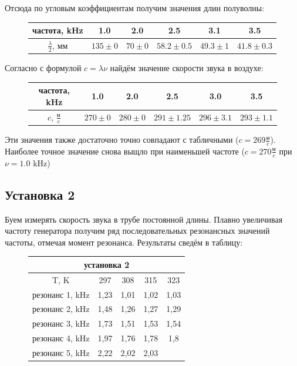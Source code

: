 \documentclass{article}
\begin{document}
Отсюда по угловым коэффициентам получим значения длин полуволны:

\begin{figure}[H]
    \centering
    \begin{tabular}{|c|c|c|c|c|c|}
    \hline
    частота, kHz & 1.0 & 2.0 & 2.5 & 3.1 & 3.5 \\\hline
    $\frac{\lambda}{2}$, мм & $135 \pm 0$ & $70 \pm 0$ & $58.2 \pm 0.5$ & $49.3 \pm 1$ & $41.8 \pm 0.3$ \\\hline
    \end{tabular}
\end{figure}

Согласно с формулой $c = \lambda \nu$ найдём значение скорости звука в воздухе:


\begin{figure}[H]
    \centering
    \begin{tabular}{|c|c|c|c|c|c|}
    \hline
    частота, kHz & 1.0 & 2.0 & 2.5 & 3.0 & 3.5 \\\hline
    $c$, $\frac{\text{м}}{c}$ & $270 \pm 0$ & $280 \pm 0$ & $291 \pm 1.25$ & $296 \pm 3.1$ & $293 \pm 1.1$ \\\hline
    \end{tabular}
\end{figure}
Эти значения также достаточно точно совпадают с табличными ($c = 269 \frac{\text{м}}{c}$).
Наиболее точное значение снова выщло при наименьшей частоте ($c = 270 \frac{\text{м}}{c}$ 
при $\nu = 1.0$ kHz)

\subsection{Установка 2}
Буем измерять скорость звука в трубе постоянной длины. Плавно увеличивая частоту генератора
 получим ряд последовательных резонансных значений частоты, отмечая момент резонанса.
 Результаты сведём в таблицу:

 \begin{figure}[H]
    \centering
    \begin{tabular}{|c|c|c|c|c|}
        \hline
        \multicolumn{5}{|c|}{установка 2} \\\hline
        T, K            & 297  &  308  &  315  &  323  \\\hline
        резонанс 1, kHz & 1,23 &  1,01 &  1,02 &  1,03 \\\hline
        резонанс 2, kHz & 1,48 &  1,26 &  1,27 &  1,29 \\\hline
        резонанс 3, kHz & 1,73 &  1,51 &  1,53 &  1,54 \\\hline
        резонанс 4, kHz & 1,97 &  1,76 &  1,78 &  1,8  \\\hline
        резонанс 5, kHz & 2,22 &  2,02 &  2,03 &       \\\hline
    \end{tabular}
 \end{figure}
\end{document}
